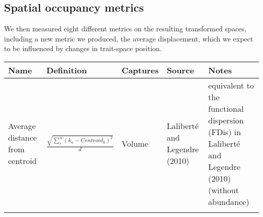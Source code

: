 \documentclass[]{article}
\begin{document}
\subsection{Spatial occupancy metrics}\label{spatial-occupancy-metrics}

We then measured eight different metrics on the resulting transformed
spaces, including a new metric we produced, the average displacement,
which we expect to be influenced by changes in trait-space position.

\renewcommand\baselinestretch{1}\selectfont

\begin{longtable}[]{@{}lllll@{}}
\toprule
\begin{minipage}[b]{0.08\columnwidth}\raggedright\strut
Name\strut
\end{minipage} & \begin{minipage}[b]{0.16\columnwidth}\raggedright\strut
Definition\strut
\end{minipage} & \begin{minipage}[b]{0.13\columnwidth}\raggedright\strut
Captures\strut
\end{minipage} & \begin{minipage}[b]{0.11\columnwidth}\raggedright\strut
Source\strut
\end{minipage} & \begin{minipage}[b]{0.11\columnwidth}\raggedright\strut
Notes\strut
\end{minipage}\tabularnewline
\midrule
\endhead
\begin{minipage}[t]{0.08\columnwidth}\raggedright\strut
Average distance from centroid\strut
\end{minipage} & \begin{minipage}[t]{0.16\columnwidth}\raggedright\strut
\(\frac{\sqrt{\sum_{i}^{n}{({k}_{n}-Centroid_{k})^2}}}{d}\)\strut
\end{minipage} & \begin{minipage}[t]{0.13\columnwidth}\raggedright\strut
Volume\strut
\end{minipage} & \begin{minipage}[t]{0.11\columnwidth}\raggedright\strut
Laliberté and Legendre (2010)\strut
\end{minipage} & \begin{minipage}[t]{0.11\columnwidth}\raggedright\strut
equivalent to the functional dispersion (FDis) in Laliberté and Legendre
(2010) (without abundance)\strut
\end{minipage}\tabularnewline
\begin{minipage}[t]{0.08\columnwidth}\raggedright\strut

\end{minipage}
\end{longtable}
\end{document}
